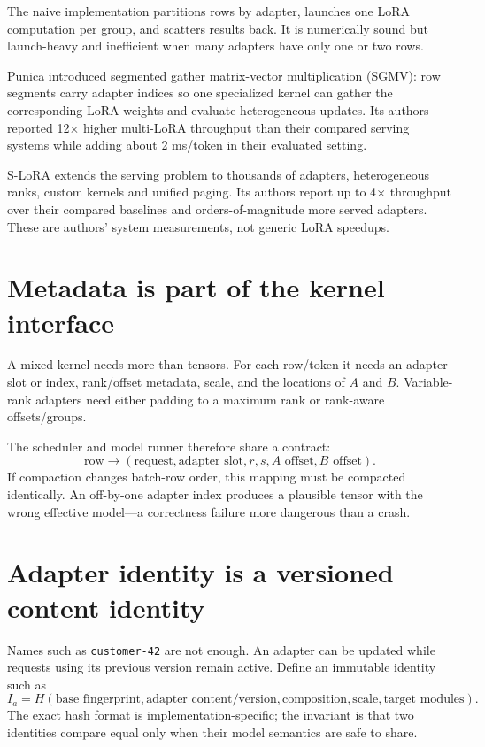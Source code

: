 The naive implementation partitions rows by adapter, launches one LoRA computation
per group, and scatters results back. It is numerically sound but launch-heavy and
inefficient when many adapters have only one or two rows.

Punica introduced segmented gather matrix-vector multiplication (SGMV): row segments
carry adapter indices so one specialized kernel can gather the corresponding LoRA
weights and evaluate heterogeneous updates. Its authors reported 12$\times$ higher
multi-LoRA throughput than their compared serving systems while adding about 2 ms/token
in their evaluated setting. \cite{chen2024punica}

S-LoRA extends the serving problem to thousands of adapters, heterogeneous ranks,
custom kernels and unified paging. Its authors report up to 4$\times$ throughput over
their compared baselines and orders-of-magnitude more served adapters. These are
authors' system measurements, not generic LoRA speedups. \cite{sheng2024slora}


\section{Metadata is part of the kernel interface}

A mixed kernel needs more than tensors. For each row/token it needs an adapter slot or
index, rank/offset metadata, scale, and the locations of $A$ and $B$. Variable-rank
adapters need either padding to a maximum rank or rank-aware offsets/groups.

The scheduler and model runner therefore share a contract:
\[
\text{row}\rightarrow
(\text{request},\text{adapter slot},r,s,A\text{ offset},B\text{ offset}).
\]
If compaction changes batch-row order, this mapping must be compacted identically.
An off-by-one adapter index produces a plausible tensor with the wrong effective
model---a correctness failure more dangerous than a crash.

\section{Adapter identity is a versioned content identity}

Names such as \texttt{customer-42} are not enough. An adapter can be updated while
requests using its previous version remain active. Define an immutable identity such
as
\[
I_a=H(\text{base fingerprint},\text{adapter content/version},
      \text{composition},\text{scale},\text{target modules}).
\]
The exact hash format is implementation-specific; the invariant is that two identities
compare equal only when their model semantics are safe to share.

